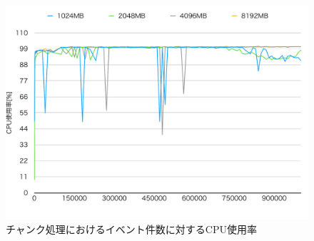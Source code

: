 \documentclass[../../../../../main]{subfiles}
\begin{document}
    \begin{figure}[H]
        \centering
        \includegraphics[width=12cm]{graph}
        \caption{チャンク処理におけるイベント件数に対するCPU使用率}
        \label{fig:chunk-cpu-app_1_1024-db_1_1024}
    \end{figure}
\end{document}
